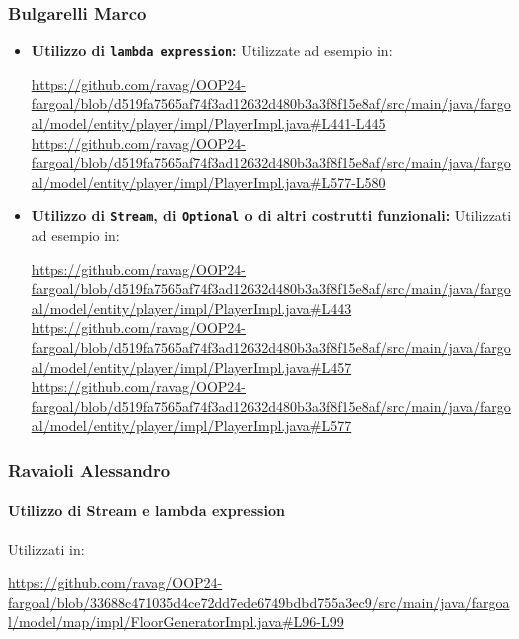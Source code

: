 \documentclass{report}
\begin{document}
\subsubsection{Bulgarelli Marco}

\begin{itemize}
    \item \textbf{Utilizzo di \texttt{lambda expression}:}\newline
    Utilizzate ad esempio in:
    \begin{sloppypar}
        \url{https://github.com/ravag/OOP24-fargoal/blob/d519fa7565af74f3ad12632d480b3a3f8f15e8af/src/main/java/fargoal/model/entity/player/impl/PlayerImpl.java#L441-L445}\newline
        \url{https://github.com/ravag/OOP24-fargoal/blob/d519fa7565af74f3ad12632d480b3a3f8f15e8af/src/main/java/fargoal/model/entity/player/impl/PlayerImpl.java#L577-L580}
    \end{sloppypar}
    \item \textbf{Utilizzo di \texttt{Stream}, di \texttt{Optional} o di altri costrutti funzionali:}\newline
    Utilizzati ad esempio in:
    \begin{sloppypar}
        \url{https://github.com/ravag/OOP24-fargoal/blob/d519fa7565af74f3ad12632d480b3a3f8f15e8af/src/main/java/fargoal/model/entity/player/impl/PlayerImpl.java#L443}\newline
        \url{https://github.com/ravag/OOP24-fargoal/blob/d519fa7565af74f3ad12632d480b3a3f8f15e8af/src/main/java/fargoal/model/entity/player/impl/PlayerImpl.java#L457}\newline
        \url{https://github.com/ravag/OOP24-fargoal/blob/d519fa7565af74f3ad12632d480b3a3f8f15e8af/src/main/java/fargoal/model/entity/player/impl/PlayerImpl.java#L577}
    \end{sloppypar}
\end{itemize}

\subsubsection{Ravaioli Alessandro}
\paragraph{Utilizzo di Stream e lambda expression}
Utilizzati in: 
\begin{sloppypar}
    \url{https://github.com/ravag/OOP24-fargoal/blob/33688c471035d4ce72dd7ede6749bdbd755a3ec9/src/main/java/fargoal/model/map/impl/FloorGeneratorImpl.java#L96-L99}
\end{sloppypar}
\end{document}
